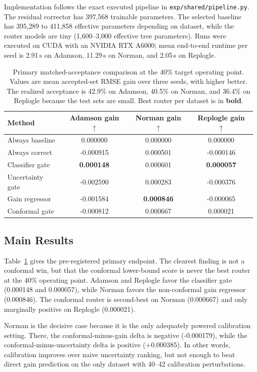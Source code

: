 \documentclass{article}
\begin{document}
Implementation follows the exact executed pipeline in \texttt{exp/shared/pipeline.py}. The residual corrector has 397{,}568 trainable parameters. The selected baseline has 395{,}289 to 411{,}858 effective parameters depending on dataset, while the router models are tiny (1{,}600--3{,}000 effective tree parameters). Runs were executed on CUDA with an NVIDIA RTX A6000; mean end-to-end runtime per seed is 2.91\,s on Adamson, 11.29\,s on Norman, and 2.05\,s on Replogle.

\begin{table}[t]
\caption{Primary matched-acceptance comparison at the 40\% target operating point. Values are mean accepted-set RMSE gain over three seeds, with higher better. The realized acceptance is 42.9\% on Adamson, 40.5\% on Norman, and 36.4\% on Replogle because the test sets are small. Best router per dataset is in \textbf{bold}.}
\label{tab:main}
\centering
\small
\begin{tabular}{lccc}
\toprule
Method & Adamson gain $\uparrow$ & Norman gain $\uparrow$ & Replogle gain $\uparrow$ \\
\midrule
Always baseline & 0.000000 & 0.000000 & 0.000000 \\
Always correct & -0.000915 & 0.000501 & -0.000146 \\
Classifier gate & \textbf{0.000148} & 0.000601 & \textbf{0.000057} \\
Uncertainty gate & -0.002590 & 0.000283 & -0.000376 \\
Gain regressor & -0.001584 & \textbf{0.000846} & -0.000065 \\
Conformal gate & -0.000812 & 0.000667 & 0.000021 \\
\bottomrule
\end{tabular}
\end{table}

\subsection{Main Results}
Table~\ref{tab:main} gives the pre-registered primary endpoint. The clearest finding is not a conformal win, but that the conformal lower-bound score is never the best router at the 40\% operating point. Adamson and Replogle favor the classifier gate (0.000148 and 0.000057), while Norman favors the non-conformal gain regressor (0.000846). The conformal router is second-best on Norman (0.000667) and only marginally positive on Replogle (0.000021).

Norman is the decisive case because it is the only adequately powered calibration setting. There, the conformal-minus-gain delta is negative (-0.000179), while the conformal-minus-uncertainty delta is positive (+0.000385). In other words, calibration improves over naive uncertainty ranking, but not enough to beat direct gain prediction on the only dataset with 40--42 calibration perturbations.
\end{document}
